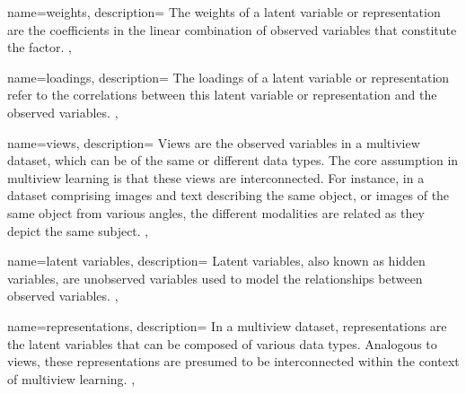  {
    name={weights},
    description={
        The weights of a latent variable or representation are the coefficients in the linear combination of observed variables that constitute the factor.
    },
}

 {
    name={loadings},
    description={
        The loadings of a latent variable or representation refer to the correlations between this latent variable or representation and the observed variables.
    },
}

 {
    name={views},
    description={
        Views are the observed variables in a multiview dataset, which can be of the same or different data types. The core assumption in multiview learning is that these views are interconnected. For instance, in a dataset comprising images and text describing the same object, or images of the same object from various angles, the different modalities are related as they depict the same subject.
    },
}

 {
    name={latent variables},
    description={
        Latent variables, also known as hidden variables, are unobserved variables used to model the relationships between observed variables.
    },
}

 {
    name={representations},
    description={
        In a multiview dataset, representations are the latent variables that can be composed of various data types. Analogous to views, these representations are presumed to be interconnected within the context of multiview learning.
    },
}
